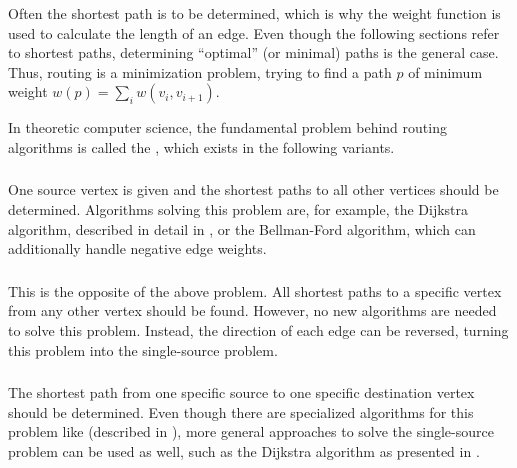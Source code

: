 		Often the shortest path is to be determined, which is why the weight function is used to calculate the length of an edge.
		Even though the following sections refer to shortest paths, determining \enquote{optimal} (or minimal) paths is the general case.
		Thus, routing is a minimization problem, trying to find a path $p$ of minimum weight $w(p) = \sum_i{w(v_i, v_{i+1})}$.
		
		In theoretic computer science, the fundamental problem behind routing algorithms is called the , which exists in the following variants.
		
		\subsubsection{}
		\label{subsubsec:single-source-shortest-path}
		
			One source vertex is given and the shortest paths to all other vertices should be determined.
			Algorithms solving this problem are, for example, the Dijkstra algorithm, described in detail in , or the Bellman-Ford algorithm, which can additionally handle negative edge weights\cite[651]{cormen-introduction-to-alg}.
		
		\subsubsection{}
		
			This is the opposite of the above problem.
			All shortest paths to a specific vertex from any other vertex should be found.
			However, no new algorithms are needed to solve this problem.
			Instead, the direction of each edge can be reversed, turning this problem into the single-source problem.
		
		\subsubsection{}
		
			The shortest path from one specific source to one specific destination vertex should be determined.
			Even though there are specialized algorithms for this problem like  (described in ), more general approaches to solve the single-source problem can be used as well, such as the Dijkstra algorithm as presented in .
		
